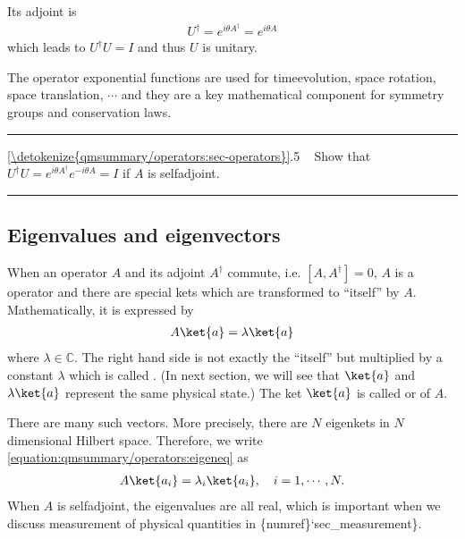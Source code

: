 \documentclass[letterpaper,10pt,english]{jupyterBook}
\begin{document}
\sphinxAtStartPar
Its adjoint is
\begin{equation*}
\begin{split}
U^\dagger = e^{i \theta A^\dagger} = e^{i \theta A}
\end{split}
\end{equation*}
\sphinxAtStartPar
which leads to \(U^\dagger U = I\) and thus \(U\) is unitary.

\sphinxAtStartPar
The operator exponential functions are used for time\sphinxhyphen{}evolution, space rotation, space translation, \(\cdots\) and they are a key mathematical component for symmetry groups and conservation laws.


\bigskip\hrule\bigskip


\sphinxAtStartPar
{} \hyperref[\detokenize{qmsummary/operators:sec-operators}]{\ref{\detokenize{qmsummary/operators:sec-operators}}}.5     Show that \(U^\dagger U = e^{i \theta A^\dagger} e^{-i \theta A} = I\) if \(A\) is self\sphinxhyphen{}adjoint.


\bigskip\hrule\bigskip



\subsection{Eigenvalues and eigenvectors}
\label{\detokenize{qmsummary/operators:eigenvalues-and-eigenvectors}}
\sphinxAtStartPar
When an operator \(A\) and its adjoint \(A^\dagger\) commute, i.e. \([A,A^\dagger]=0\), \(A\) is a  operator and there are special kets which are transformed to “itself”  by \(A\).  Mathematically, it is expressed by
\begin{equation}\label{equation:qmsummary/operators:eigeneq}
\begin{split}
A \ket{a} = \lambda \ket{a}
\end{split}
\end{equation}
\sphinxAtStartPar
where \(\lambda \in \mathbb{C}\).  The right hand side is not exactly the “itself” but multiplied by a constant \(\lambda\) which is called .  (In next section, we will see that \(\ket{a}\) and \(\lambda \ket{a}\) represent the same physical state.)  The ket \(\ket{a}\) is called  or  of \(A\).

\sphinxAtStartPar
There are many such vectors.  More precisely, there are \(N\) eigenkets in \(N\)\sphinxhyphen{}dimensional Hilbert space.  Therefore, we write \eqref{equation:qmsummary/operators:eigeneq} as
\begin{equation*}
\begin{split}
A \ket{a_i} = \lambda_i \ket{a_i}, \quad i=1,\cdots, N.
\end{split}
\end{equation*}
\sphinxAtStartPar
When \(A\) is self\sphinxhyphen{}adjoint, the eigenvalues are all real, which is important when we discuss measurement of physical quantities in \{numref\}`sec\_measurement\}.
\end{document}
